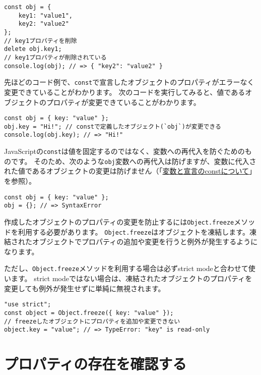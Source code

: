 \begin{lstlisting}
const obj = {
    key1: "value1",
    key2: "value2"
};
// key1プロパティを削除
delete obj.key1;
// key1プロパティが削除されている
console.log(obj); // => { "key2": "value2" }
\end{lstlisting}

\begin{tcolorbox}[title=constで定義したオブジェクトは変更可能]\label{const-and-object}

先ほどのコード例で、\texttt{const}で宣言したオブジェクトのプロパティがエラーなく変更できていることがわかります。
次のコードを実行してみると、値であるオブジェクトのプロパティが変更できていることがわかります。

\begin{lstlisting}
const obj = { key: "value" };
obj.key = "Hi!"; // constで定義したオブジェクト(`obj`)が変更できる
console.log(obj.key); // => "Hi!"
\end{lstlisting}

JavaScriptの\texttt{const}は値を固定するのではなく、変数への再代入を防ぐためのものです。
そのため、次のような\texttt{obj}変数への再代入は防げますが、変数に代入された値であるオブジェクトの変更は防げません（「\href{../variables/README.md\#const}{変数と宣言のconstについて}」を参照）。

\begin{lstlisting}
const obj = { key: "value" };
obj = {}; // => SyntaxError
\end{lstlisting}

作成したオブジェクトのプロパティの変更を防止するには\texttt{Object.freeze}メソッドを利用する必要があります。
\texttt{Object.freeze}はオブジェクトを凍結します。凍結されたオブジェクトでプロパティの追加や変更を行うと例外が発生するようになります。

ただし、\texttt{Object.freeze}メソッドを利用する場合は必ずstrict
modeと合わせて使います。 strict
modeではない場合は、凍結されたオブジェクトのプロパティを変更しても例外が発生せずに単純に無視されます。

\begin{lstlisting}
"use strict";
const object = Object.freeze({ key: "value" });
// freezeしたオブジェクトにプロパティを追加や変更できない
object.key = "value"; // => TypeError: "key" is read-only
\end{lstlisting}
\end{tcolorbox}

\hypertarget{confirm-property}{%
\section{プロパティの存在を確認する}\label{confirm-property}}

